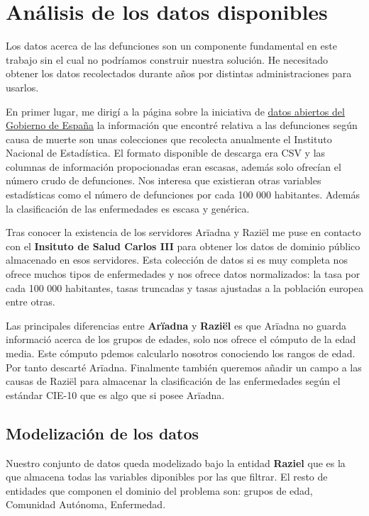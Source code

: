 \chapter{Análisis de los datos disponibles}

Los datos acerca de las defunciones son un componente fundamental en este trabajo sin
el cual no podríamos construir nuestra solución. He necesitado obtener los datos recolectados
durante años por distintas administraciones para usarlos.

En primer lugar, me dirigí a la página sobre la iniciativa de \href{https://datos.gob.es/}{datos abiertos del Gobierno de España}
la información que encontré relativa a las defunciones
según causa de muerte son unas colecciones que recolecta anualmente el Instituto
Nacional de Estadística. El formato disponible de descarga era CSV y las columnas de información
propocionadas eran escasas, además solo ofrecían el número crudo de defunciones. Nos interesa que existieran
otras variables estadísticas como el número de defunciones por cada 100 000 habitantes. Además la clasificación de
las enfermedades es escasa y genérica.

Tras conocer la existencia de los servidores Arïadna y Raziël me puse en contacto con el \textbf{Insituto de Salud Carlos
III} para obtener los datos de dominio público almacenado en esos servidores. Esta colección de datos si es muy completa
nos ofrece muchos tipos de enfermedades y nos ofrece datos normalizados: la tasa por cada 100 000 habitantes, tasas truncadas y
tasas ajustadas a la población europea entre otras.

Las principales diferencias entre \textbf{Arïadna} y \textbf{Raziël} es que Arïadna no guarda informació acerca
de los grupos de edades, solo nos ofrece el cómputo de la edad media. Este cómputo pdemos calcularlo nosotros conociendo
los rangos de edad. Por tanto descarté Arïadna.
Finalmente también queremos añadir un campo a las causas de Raziël para almacenar la clasificación de las 
enfermedades según el estándar \gls{CIE-10} que es algo que si posee Arïadna.

\section{Modelización de los datos}
Nuestro conjunto de datos queda modelizado bajo la entidad \textbf{Raziel} que es la que almacena todas las variables
diponibles por las que filtrar. El resto de entidades que componen el dominio del problema son: grupos de edad,
Comunidad Autónoma, Enfermedad.
